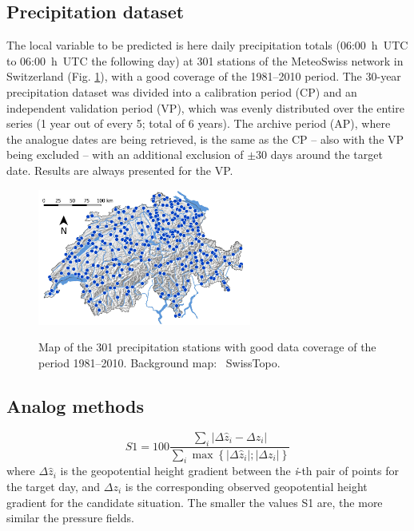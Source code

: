 \documentclass[alpha-refs]{wiley-article}
\begin{document}

\subsection{Precipitation dataset}

The local variable to be predicted is here daily precipitation totals (06:00~h~UTC to 06:00~h~UTC the following day) at 301 stations of the MeteoSwiss network in Switzerland (Fig. \ref{fig:stations}), with a good coverage of the 1981--2010 period. The 30-year precipitation dataset was divided into a calibration period (CP) and an independent validation period (VP), which was evenly distributed over the entire series (1 year out of every 5; total of 6 years). The archive period (AP), where the analogue dates are being retrieved, is the same as the CP -- also with the VP being excluded -- with an additional exclusion of $\pm30$ days around the target date. Results are always presented for the VP.

\begin{figure}
	\includegraphics[width=70mm]{figures/map-stations.jpg}\\
	\caption{Map of the 301 precipitation stations with good data coverage of the period 1981--2010. Background map: \textcopyright\ SwissTopo.}
	\label{fig:stations}
\end{figure}


\subsection{Analog methods}

\begin{equation}
\label{eq:S1}
S1=100 \frac{\sum_{i} \vert \Delta\hat{z}_{i} - \Delta z_{i} \vert}{\sum_{i} \max\left\lbrace \vert \Delta\hat{z}_{i} \vert; \vert \Delta z_{i} \vert \right\rbrace }
\end{equation}
where $\Delta \hat{z}_{i}$ is the geopotential height gradient between the \textit{i}-th pair of points for the target day, and $\Delta z_{i}$ is the corresponding observed geopotential height gradient for the candidate situation. The smaller the values S1 are, the more similar the pressure fields.
\end{document}
